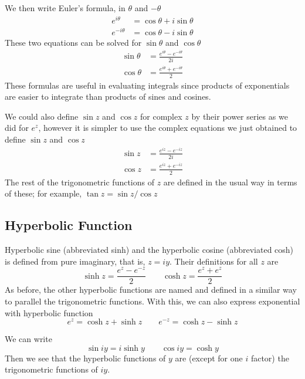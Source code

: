 \documentclass[../../../main.tex]{subfiles}
\begin{document}
We then write Euler's formula, in $\theta$ and $-\theta$
\begin{align*}
    e^{i\theta}  & =\cos\theta+i\sin\theta \\
    e^{-i\theta} & =\cos\theta-i\sin\theta
\end{align*}
These two equations can be solved for $\sin\theta$ and $\cos\theta$
\begin{align*}
    \sin \theta & =\frac{e^{i\theta}-e^{-i\theta}}{2i} \\
    \cos \theta & =\frac{e^{i\theta}+e^{-i\theta}}{2}
\end{align*}
These formulas are useful in evaluating integrals since products of exponentials are
easier to integrate than products of sines and cosines.

We could also deﬁne $\sin z$ and $\cos z$ for complex $z$ by their power series as we did for $e^z$, however it is simpler to use the complex equations we just obtained to define  $\sin z$ and $\cos z$
\begin{align*}
    \sin z & =\frac{e^{iz}-e^{-iz}}{2i} \\
    \cos z & =\frac{e^{iz}+e^{-iz}}{2}
\end{align*}
The rest of the trigonometric functions of $z$ are deﬁned in the usual way in terms of these; for example, $\tan z = \sin z/ \cos z$

\subsection{Hyperbolic Function}

Hyperbolic sine (abbreviated sinh) and the hyperbolic cosine (abbreviated cosh) is defined from pure imaginary, that is, $ z = iy$. Their deﬁnitions for all $z$ are
\begin{equation*}
    \sinh z=\frac{e^{z}-e^{-z}}{2}\qquad
    \cosh z=\frac{e^{z}+e^{z}}{2}
\end{equation*}
As before, the other hyperbolic functions are named and deﬁned in a similar way to parallel the trigonometric functions.
With this, we can also express exponential with hyperbolic function
\begin{equation*}
    e^z = \cosh z + \sinh z \qquad
    e^{-z}= \cosh z - \sinh z
\end{equation*}

We can write
\begin{equation*}
    \sin iy  = i \sinh y \qquad
    \cos iy  =\cosh y    
\end{equation*}
Then we see that the hyperbolic functions of $y$ are (except for one $i$ factor) the trigonometric functions of $iy$.
\end{document}
